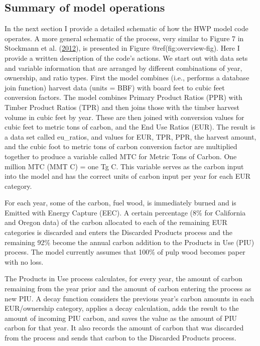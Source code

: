 \documentclass[
  openany]{book}
\begin{document}
\hypertarget{model-func-opp}{%
\subsection{Summary of model operations}\label{model-func-opp}}

In the next section I provide a detailed schematic of how the HWP model
code operates. A more general schematic of the process, very similar to
Figure 7 in Stockmann et al.
(\protect\hyperlink{ref-stockmann2012}{2012}), is presented in Figure
@ref(fig:overview-fig). Here I provide a written description of the
code's actions. We start out with data sets and variable information
that are arranged by different combinations of year, ownership, and
ratio types. First the model combines (i.e., performs a database join
function) harvest data (units = BBF) with board feet to cubic feet
conversion factors. The model combines Primary Product Ratios (PPR) with
Timber Product Ratios (TPR) and then joins those with the timber harvest
volume in cubic feet by year. These are then joined with conversion
values for cubic feet to metric tons of carbon, and the End Use Ratios
(EUR). The result is a data set called eu\_ratios, and values for EUR,
TPR, PPR, the harvest amount, and the cubic foot to metric tons of
carbon conversion factor are multiplied together to produce a variable
called MTC for Metric Tons of Carbon. One million MTC (MMT C) = one Tg
C. This variable serves as the carbon input into the model and has the
correct units of carbon input per year for each EUR category.

For each year, some of the carbon, fuel wood, is immediately burned and
is Emitted with Energy Capture (EEC). A certain percentage (8\% for
California and Oregon data) of the carbon allocated to each of the
remaining EUR categories is discarded and enters the Discarded Products
process and the remaining 92\% become the annual carbon addition to the
Products in Use (PIU) process. The model currently assumes that 100\% of
pulp wood becomes paper with no loss.

The Products in Use process calculates, for every year, the amount of
carbon remaining from the year prior and the amount of carbon entering
the process as new PIU. A decay function considers the previous year's
carbon amounts in each EUR/ownership category, applies a decay
calculation, adds the result to the amount of incoming PIU carbon, and
saves the value as the amount of PIU carbon for that year. It also
records the amount of carbon that was discarded from the process and
sends that carbon to the Discarded Products process.
\end{document}
